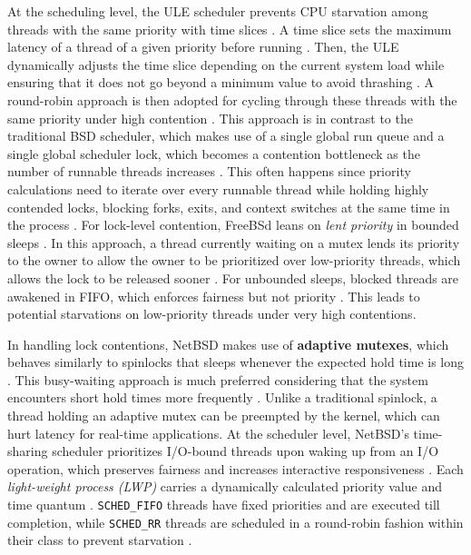 At the scheduling level, the ULE scheduler prevents CPU starvation among threads with the same priority with time slices
\parencite{mckusick2014_process}. A time slice sets the maximum latency of a thread of a given priority before running
\parencite{mckusick2014_process}. Then, the ULE dynamically adjusts the time slice depending on the current system load while
ensuring that it does not go beyond a minimum value to avoid thrashing \parencite{mckusick2014_process}. A round-robin approach
is then adopted for cycling through these threads with the same priority under high contention \parencite{mckusick2014_process}.
This approach is in contrast to the traditional BSD scheduler, which makes use of a single global run queue and a single global
scheduler lock, which becomes a contention bottleneck as the number of runnable threads increases \parencite{mckusick2014_process}.
This often happens since priority calculations need to iterate over every runnable thread while holding highly contended locks,
blocking forks, exits, and context switches at the same time in the process \parencite{mckusick2014_process}. For lock-level
contention, FreeBSd leans on \textit{lent priority} in bounded sleeps \parencite{freebsd_locking}. In this approach, a thread
currently waiting on a mutex lends its priority to the owner to allow the owner to be prioritized over low-priority threads,
which allows the lock to be released sooner \parencite{freebsd_locking}. For unbounded sleeps, blocked threads are awakened
in FIFO, which enforces fairness but not priority \parencite{freebsd_locking}. This leads to potential starvations on low-priority
threads under very high contentions.

In handling lock contentions, NetBSD makes use of \textbf{adaptive mutexes}, which behaves similarly to spinlocks that sleeps
whenever the expected hold time is long \parencite{netbsd_locking}. This busy-waiting approach is much preferred considering
that the system encounters short hold times more frequently \parencite{netbsd_locking}. Unlike a traditional spinlock, a thread
holding an adaptive mutex can be preempted by the kernel, which can hurt latency for real-time applications. At the scheduler level,
NetBSD's time-sharing scheduler prioritizes I/O-bound threads upon waking up from an I/O operation, which preserves fairness and
increases interactive responsiveness \parencite{rasiukevicius2009}. Each \textit{light-weight process (LWP)} carries a dynamically
calculated priority value and time quantum \parencite{rasiukevicius2009}. \texttt{SCHED\_FIFO} threads have fixed priorities
and are executed till completion, while \texttt{SCHED\_RR} threads are scheduled in a round-robin fashion within their class to
prevent starvation \parencite{rasiukevicius2009}.

